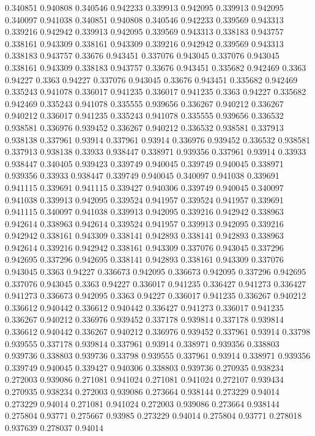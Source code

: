 0.340851 0.940808
0.340546 0.942233
0.339913 0.942095
0.339913 0.942095
0.340097 0.941038
0.340851 0.940808
0.340546 0.942233
0.339569 0.943313
0.339216 0.942942
0.339913 0.942095
0.339569 0.943313
0.338183 0.943757
0.338161 0.943309
0.338161 0.943309
0.339216 0.942942
0.339569 0.943313
0.338183 0.943757
0.33676 0.943451
0.337076 0.943045
0.337076 0.943045
0.338161 0.943309
0.338183 0.943757
0.33676 0.943451
0.335682 0.942469
0.3363 0.94227
0.3363 0.94227
0.337076 0.943045
0.33676 0.943451
0.335682 0.942469
0.335243 0.941078
0.336017 0.941235
0.336017 0.941235
0.3363 0.94227
0.335682 0.942469
0.335243 0.941078
0.335555 0.939656
0.336267 0.940212
0.336267 0.940212
0.336017 0.941235
0.335243 0.941078
0.335555 0.939656
0.336532 0.938581
0.336976 0.939452
0.336267 0.940212
0.336532 0.938581
0.337913 0.938138
0.337961 0.93914
0.337961 0.93914
0.336976 0.939452
0.336532 0.938581
0.337913 0.938138
0.33933 0.938447
0.338971 0.939356
0.337961 0.93914
0.33933 0.938447
0.340405 0.939423
0.339749 0.940045
0.339749 0.940045
0.338971 0.939356
0.33933 0.938447
0.339749 0.940045
0.340097 0.941038
0.339691 0.941115
0.339691 0.941115
0.339427 0.940306
0.339749 0.940045
0.340097 0.941038
0.339913 0.942095
0.339524 0.941957
0.339524 0.941957
0.339691 0.941115
0.340097 0.941038
0.339913 0.942095
0.339216 0.942942
0.338963 0.942614
0.338963 0.942614
0.339524 0.941957
0.339913 0.942095
0.339216 0.942942
0.338161 0.943309
0.338141 0.942893
0.338141 0.942893
0.338963 0.942614
0.339216 0.942942
0.338161 0.943309
0.337076 0.943045
0.337296 0.942695
0.337296 0.942695
0.338141 0.942893
0.338161 0.943309
0.337076 0.943045
0.3363 0.94227
0.336673 0.942095
0.336673 0.942095
0.337296 0.942695
0.337076 0.943045
0.3363 0.94227
0.336017 0.941235
0.336427 0.941273
0.336427 0.941273
0.336673 0.942095
0.3363 0.94227
0.336017 0.941235
0.336267 0.940212
0.336612 0.940442
0.336612 0.940442
0.336427 0.941273
0.336017 0.941235
0.336267 0.940212
0.336976 0.939452
0.337178 0.939814
0.337178 0.939814
0.336612 0.940442
0.336267 0.940212
0.336976 0.939452
0.337961 0.93914
0.33798 0.939555
0.337178 0.939814
0.337961 0.93914
0.338971 0.939356
0.338803 0.939736
0.338803 0.939736
0.33798 0.939555
0.337961 0.93914
0.338971 0.939356
0.339749 0.940045
0.339427 0.940306
0.338803 0.939736
0.270935 0.938234
0.272003 0.939086
0.271081 0.941024
0.271081 0.941024
0.272107 0.939434
0.270935 0.938234
0.272003 0.939086
0.273664 0.938144
0.273229 0.94014
0.273229 0.94014
0.271081 0.941024
0.272003 0.939086
0.273664 0.938144
0.275804 0.93771
0.275667 0.93985
0.273229 0.94014
0.275804 0.93771
0.278018 0.937639
0.278037 0.94014
